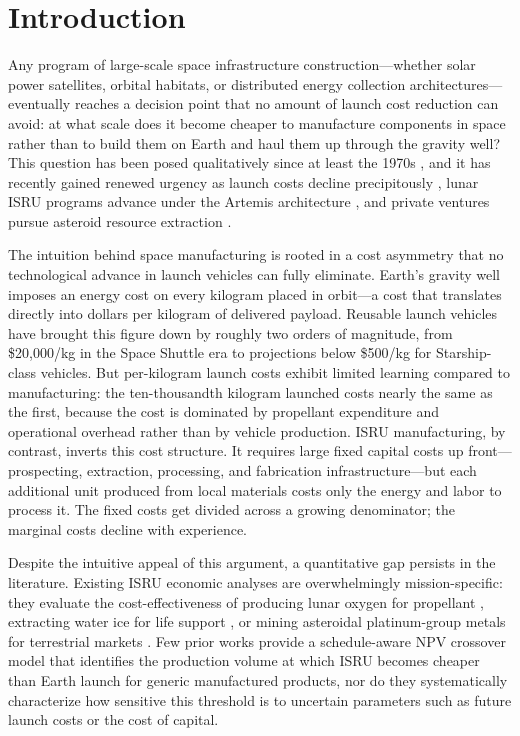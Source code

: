 \documentclass[preprint,12pt]{elsarticle}
\begin{document}
\linenumbers

\section{Introduction}
\label{sec:introduction}

Any program of large-scale space infrastructure construction---whether solar power satellites, orbital habitats, or distributed energy collection architectures---eventually reaches a decision point that no amount of launch cost reduction can avoid: at what scale does it become cheaper to manufacture components in space rather than to build them on Earth and haul them up through the gravity well? This question has been posed qualitatively since at least the 1970s \cite{oneill1974,oneill1976}, and it has recently gained renewed urgency as launch costs decline precipitously \cite{jones2018}, lunar ISRU programs advance under the Artemis architecture \cite{sanders2015}, and private ventures pursue asteroid resource extraction \cite{elvis2012,andrews2015}.

The intuition behind space manufacturing is rooted in a cost asymmetry that no technological advance in launch vehicles can fully eliminate. Earth's gravity well imposes an energy cost on every kilogram placed in orbit---a cost that translates directly into dollars per kilogram of delivered payload. Reusable launch vehicles have brought this figure down by roughly two orders of magnitude, from \$20{,}000/kg in the Space Shuttle era to projections below \$500/kg for Starship-class vehicles. But per-kilogram launch costs exhibit limited learning compared to manufacturing: the ten-thousandth kilogram launched costs nearly the same as the first, because the cost is dominated by propellant expenditure and operational overhead rather than by vehicle production. ISRU manufacturing, by contrast, inverts this cost structure. It requires large fixed capital costs up front---prospecting, extraction, processing, and fabrication infrastructure---but each additional unit produced from local materials costs only the energy and labor to process it. The fixed costs get divided across a growing denominator; the marginal costs decline with experience.

Despite the intuitive appeal of this argument, a quantitative gap persists in the literature. Existing ISRU economic analyses are overwhelmingly mission-specific: they evaluate the cost-effectiveness of producing lunar oxygen for propellant \cite{sanders2015}, extracting water ice for life support \cite{zubrin1996}, or mining asteroidal platinum-group metals for terrestrial markets \cite{sonter1997,elvis2012}. Few prior works provide a schedule-aware NPV crossover model that identifies the production volume at which ISRU becomes cheaper than Earth launch for generic manufactured products, nor do they systematically characterize how sensitive this threshold is to uncertain parameters such as future launch costs or the cost of capital.
\end{document}
